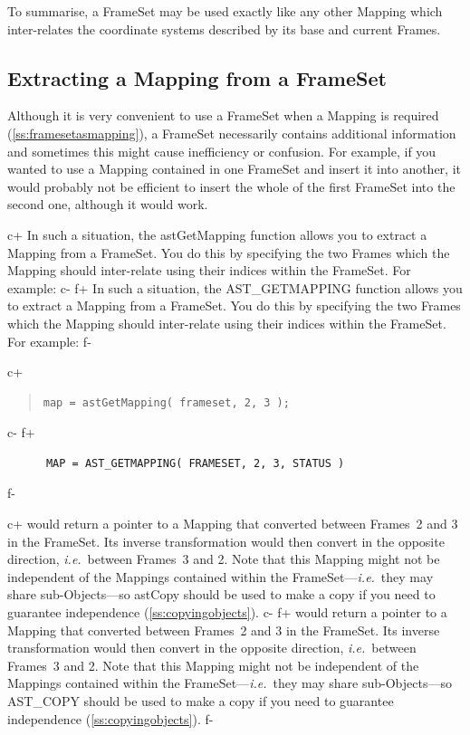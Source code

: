 \documentclass[twoside,11pt]{article}
\newcommand{\secref}[1]{\S\ref{#1}}
\renewcommand{\secref}[1]{\ref{#1}}
\begin{document}
To summarise, a FrameSet may be used exactly like any other Mapping
which inter-relates the coordinate systems described by its base and
current Frames.

\subsection{\label{ss:extractingamapping}Extracting a Mapping from a FrameSet}

Although it is very convenient to use a FrameSet when a Mapping is
required (\secref{ss:framesetasmapping}), a FrameSet necessarily
contains additional information and sometimes this might cause
inefficiency or confusion.  For example, if you wanted to use a
Mapping contained in one FrameSet and insert it into another, it would
probably not be efficient to insert the whole of the first FrameSet
into the second one, although it would work.

c+
In such a situation, the astGetMapping function allows you to extract
a Mapping from a FrameSet. You do this by specifying the two Frames
which the Mapping should inter-relate using their indices within the
FrameSet. For example:
c-
f+
In such a situation, the AST\_GETMAPPING function allows you to
extract a Mapping from a FrameSet. You do this by specifying the two
Frames which the Mapping should inter-relate using their indices
within the FrameSet. For example:
f-

c+
\begin{quote}
\small
\begin{verbatim}
map = astGetMapping( frameset, 2, 3 );
\end{verbatim}
\normalsize
\end{quote}
c-
f+
\small
\begin{verbatim}
      MAP = AST_GETMAPPING( FRAMESET, 2, 3, STATUS )
\end{verbatim}
\normalsize
f-

c+
would return a pointer to a Mapping that converted between Frames~2
and 3 in the FrameSet. Its inverse transformation would then convert
in the opposite direction, {\em{i.e.}}\ between Frames~3 and 2.  Note
that this Mapping might not be independent of the Mappings contained
within the FrameSet---{\em{i.e.}}\ they may share sub-Objects---so
astCopy should be used to make a copy if you need to guarantee
independence (\secref{ss:copyingobjects}).
c-
f+
would return a pointer to a Mapping that converted between Frames~2
and 3 in the FrameSet. Its inverse transformation would then convert
in the opposite direction, {\em{i.e.}}\ between Frames~3 and 2.  Note
that this Mapping might not be independent of the Mappings contained
within the FrameSet---{\em{i.e.}}\ they may share sub-Objects---so
AST\_COPY should be used to make a copy if you need to guarantee
independence (\secref{ss:copyingobjects}).
f-
\end{document}
